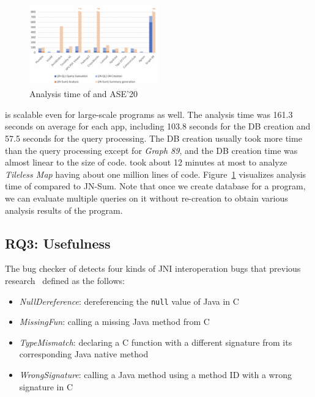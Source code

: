 \begin{figure}[t]
  \centering
  \vspace{2mm}
  \includegraphics[width=0.5\textwidth]{img/graph}
  \vspace*{-1.5em}
  \caption{Analysis time of \ours and ASE'20}
  \label{fig:graph}
\vspace*{-.5em}
\end{figure}

\ours is scalable even for large-scale programs as well. The analysis
time was 161.3 seconds on average for each app, including 103.8 seconds
for the DB creation and 57.5 seconds for the query processing. The DB creation
usually took more time than the query processing except for {\it Graph 89}, and
the DB creation time was almost linear to the size of code. \ours took
about 12 minutes at most to analyze {\it Tileless Map} having about one million
lines of code. Figure~\ref{fig:graph} visualizes analysis time of \ours
compared to JN-Sum.   Note
that once we create database for a program, we can evaluate multiple queries on
it without re-creation to obtain various analysis results of the program.


\subsection{RQ3: Usefulness}

The bug checker of \ours detects four kinds of JNI interoperation bugs
that previous research~\cite{ILEA, LeeASE20} defined as the follows:


\begin{itemize}
  \item {\it NullDereference}: dereferencing the {\tt null} value of Java in C
  \item {\it MissingFun}: calling a missing Java method from C
  \item {\it TypeMismatch}: declaring a C function with a different signature
    from its corresponding Java native method
  \item {\it WrongSignature}: calling a Java method using a method ID with a
    wrong signature in C
\end{itemize}


